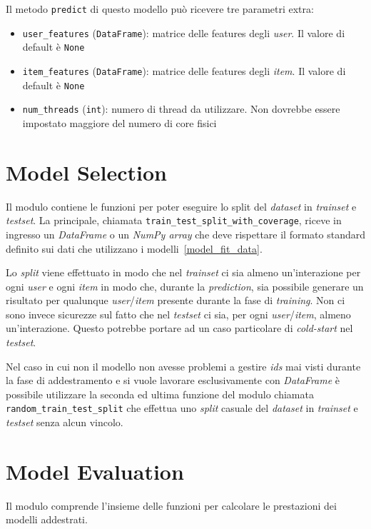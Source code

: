 Il metodo \texttt{predict} di questo modello può ricevere tre parametri extra:

\begin{itemize}
    \item \texttt{user\_features} (\texttt{DataFrame}): matrice delle features degli \textit{user}. Il valore di default è \texttt{None}
    \item \texttt{item\_features} (\texttt{DataFrame}): matrice delle features degli \textit{item}. Il valore di default è \texttt{None}
    \item \texttt{num\_threads} (\texttt{int}): numero di thread da utilizzare. Non dovrebbe essere impostato maggiore del numero di core fisici
\end{itemize}

\section{Model Selection}

Il modulo contiene le funzioni per poter eseguire lo split del 
\textit{dataset} in \textit{trainset} e \textit{testset}. La principale, chiamata \texttt{train\_test\_split\_with\_coverage}, riceve in ingresso un \textit{DataFrame} o un \textit{NumPy array} che deve rispettare il formato standard definito sui dati che utilizzano i modelli~\ref{model_fit_data}. 

Lo \textit{split} viene effettuato in modo che nel \textit{trainset} ci sia almeno un'interazione per ogni \textit{user} e ogni \textit{item} in modo che, durante la \textit{prediction}, sia possibile generare un risultato per qualunque \textit{user}/\textit{item} presente durante la fase di \textit{training}. Non ci sono invece sicurezze sul fatto che nel \textit{testset} ci sia, per ogni \textit{user}/\textit{item}, almeno un'interazione. Questo potrebbe portare ad un caso particolare di \textit{cold-start} nel \textit{testset}.

Nel caso in cui non il modello non avesse problemi a gestire \textit{ids} mai visti durante la fase di addestramento e si vuole lavorare esclusivamente con \textit{DataFrame} è possibile utilizzare la seconda ed ultima funzione del modulo chiamata \texttt{random\_train\_test\_split} che effettua uno \textit{split} casuale del \textit{dataset} in \textit{trainset} e \textit{testset} senza alcun vincolo.


\section{Model Evaluation}
Il modulo comprende l'insieme delle funzioni per calcolare le prestazioni dei modelli addestrati.

